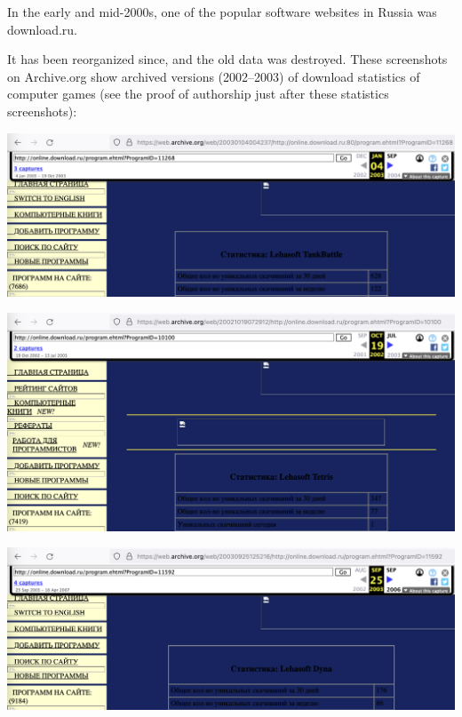 
In the early and mid-2000s,
one of the popular software websites in Russia was download.ru.

It has been reorganized since, and the old data was destroyed.
These screenshots on Archive.org show archived versions (2002--2003)
of download statistics of \mrls computer games
(see the proof of authorship just after these statistics screenshots):





\includegraphics[width=40em]{tankbattle-downloads}

\includegraphics[width=40em]{tetris-downloads}

\includegraphics[width=40em]{dyna-downloads}

